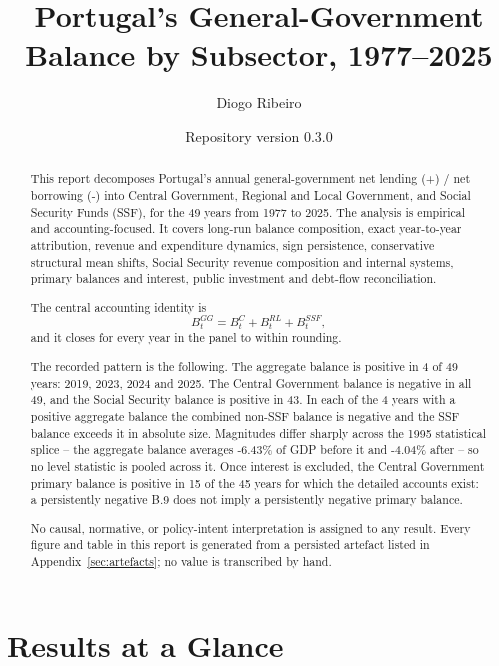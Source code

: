 \documentclass[11pt,a4paper]{article}
\title{Portugal's General-Government Balance by Subsector, 1977--2025}
\author{Diogo Ribeiro}
\date{Repository version 0.3.0}
\begin{document}
\maketitle
\begin{abstract}
\noindent
This report decomposes Portugal's annual general-government net lending (+) / net
borrowing (-) into Central Government, Regional and Local Government, and Social
Security Funds (SSF), for the 49 years from
1977 to 2025. The analysis is
empirical and accounting-focused. It covers long-run balance composition, exact
year-to-year attribution, revenue and expenditure dynamics, sign persistence,
conservative structural mean shifts, Social Security revenue composition and internal
systems, primary balances and interest, public investment and debt-flow reconciliation.

\noindent
The central accounting identity is
\[
B^{GG}_t = B^{C}_t + B^{RL}_t + B^{SSF}_t,
\]
and it closes for every year in the panel to within rounding.

\noindent
The recorded pattern is the following.
The aggregate balance is positive in 4 of 49 years: 2019, 2023, 2024 and 2025.
The Central Government balance is negative in all
49, and the Social Security
balance is positive in 43. In
each of the 4 years with a positive aggregate balance the combined non-SSF
balance is negative and the SSF balance exceeds it in absolute size. Magnitudes differ
sharply across the 1995 statistical splice -- the aggregate balance averages
-6.43\% of GDP before it and
-4.04\% after -- so no level statistic is
pooled across it. Once interest is excluded, the Central Government primary balance is
positive in 15 of the
45 years for which the detailed accounts exist: a persistently
negative B.9 does not imply a persistently negative primary balance.

\noindent
No causal, normative, or policy-intent interpretation is assigned to any result. Every
figure and table in this report is generated from a persisted artefact listed in
Appendix~\ref{sec:artefacts}; no value is transcribed by hand.
\end{abstract}

\tableofcontents

\section{Results at a Glance}
\label{sec:glance}
\end{document}
